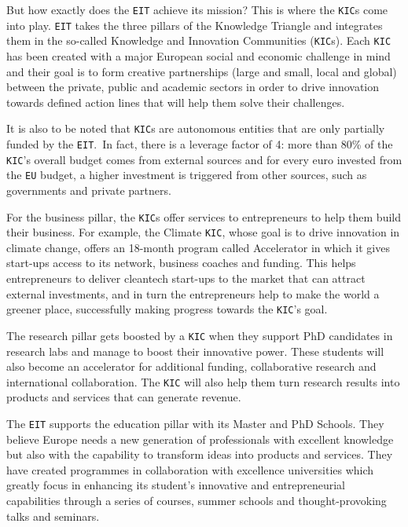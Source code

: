 \documentclass[11pt,a4paper,oneside,twocolumn]{IEEEtran}
\begin{document}
But how exactly does the \texttt{EIT} achieve its mission? This is where the \texttt{KIC}s come into play. \texttt{EIT} takes the three pillars of the Knowledge Triangle and integrates them in the so-called Knowledge and Innovation Communities (\texttt{KIC}s). Each \texttt{KIC} has been created with a major European social and economic challenge in mind and their goal is to form creative partnerships (large and small, local and global) between the private, public and academic sectors in order to drive innovation towards defined action lines that will help them solve their challenges.

It is also to be noted that \texttt{KIC}s are autonomous  entities that are only partially funded by the \texttt{EIT}.\ In fact, there is a leverage factor of 4: more than 80\% of the \texttt{KIC}'s overall budget comes from external sources and for every euro invested from the \texttt{EU} budget, a higher investment is triggered from other sources, such as governments and private partners\cite{4_2}.


For the business pillar, the \texttt{KIC}s offer services to entrepreneurs to help them build their business. For example, the Climate \texttt{KIC}, whose goal is to drive innovation in climate change, offers an 18-month program called Accelerator in which it gives start-ups access to its network, business coaches and funding. This helps entrepreneurs to deliver cleantech start-ups to the market that can attract external investments, and in turn the entrepreneurs help to make the world a greener place, successfully making progress towards the \texttt{KIC}'s goal\cite{4_3}.

The research pillar gets boosted by a \texttt{KIC} when they support PhD candidates in research labs and manage to boost their innovative power. These students will also become an accelerator for additional funding, collaborative research and international collaboration. The \texttt{KIC} will also help them turn research results into products and services that can generate revenue.

The \texttt{EIT} supports the education pillar with its Master and PhD Schools. They believe Europe needs a new generation of professionals with excellent knowledge but also with the capability to transform ideas into products and services. They have created programmes in collaboration with excellence universities which greatly focus in enhancing its student's innovative and entrepreneurial capabilities through a series of courses, summer schools and thought-provoking talks and seminars.
\end{document}
